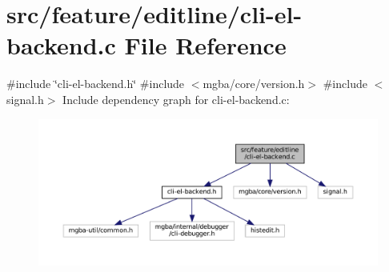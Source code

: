 \hypertarget{cli-el-backend_8c}{}\section{src/feature/editline/cli-\/el-\/backend.c File Reference}
\label{cli-el-backend_8c}
{\ttfamily \#include \char`\"{}cli-\/el-\/backend.\+h\char`\"{}}\newline
{\ttfamily \#include $<$mgba/core/version.\+h$>$}\newline
{\ttfamily \#include $<$signal.\+h$>$}\newline
Include dependency graph for cli-\/el-\/backend.c\+:
\nopagebreak
\begin{figure}[H]
\begin{center}
\leavevmode
\includegraphics[width=350pt]{cli-el-backend_8c__incl}
\end{center}
\end{figure}
